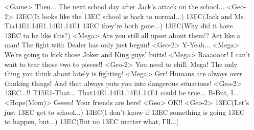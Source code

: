 <Game> Then... 
The next school day after Jack's attack on the school... 
<Geo-2> {13}{EC}(It looks like the {13}{EC} school is back to normal...) 
{13}{EC}(Jack and Ms. Tia{14}{E1}.{14}{E1}.{14}{E1}.{14}{E1} {13}{EC} they're both gone...) 
{13}{EC}(Why did it have {13}{EC} to be like this?) 
<Mega> Are you still all upset about them!? 
Act like a man! 
The fight with Dealer has only just begun! 
<Geo-2> Y-Yeah... 
<Mega> We're going to kick those Joker and King guys' butts! 
<Mega> Raaaooor! 
I can't wait to tear those two to pieces!! 
<Geo-2> You need to chill, Mega! 
The only thing you think about lately is fighting! 
<Mega> Grr! Humans are always over thinking things! 
And that always puts you into dangerous situations! 
<Geo-2> {13}{EC}...!! 
T{15}{E1}-That... That{14}{E1}.{14}{E1}.{14}{E1}.{14}{E1} could be true... 
B-But, I... 
<Hope(Mom)> Geeeo! Your friends are here! 
<Geo> OK!! 
<Geo-2> {13}{EC}(Let's just {13}{EC} get to school...) 
{13}{EC}(I don't know if {13}{EC} something is going {13}{EC} to happen, but...) 
{13}{EC}(But no {13}{EC} matter what, I'll...) 
